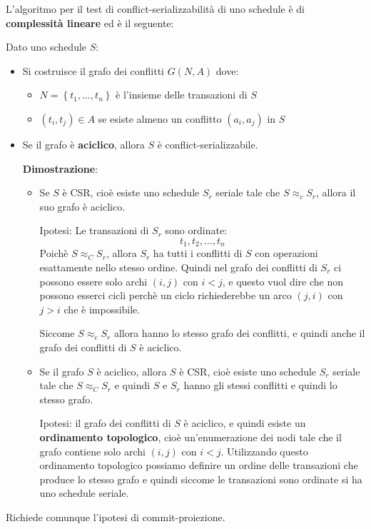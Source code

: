 \documentclass[a4paper]{article}
\begin{document}
\noindent
L'algoritmo per il test di conflict-serializzabilità di uno schedule è di \textbf{
complessità lineare} ed è il seguente:

Dato uno schedule \( S \):
\begin{itemize}
  \item Si costruisce il grafo dei conflitti \( G(N, A) \) dove:
    \begin{itemize}
      \item \( N = \left\{ t_1, \ldots, t_n \right\} \) è l'insieme delle transazioni
        di \( S \) 

      \item \( (t_i, t_j) \in A \) se esiste almeno un conflitto \( (a_i, a_j) \) in 
        \( S \)
    \end{itemize}

  \item Se il grafo è \textbf{aciclico}, allora \( S \) è conflict-serializzabile.

    \vspace{1em}
    \noindent
    \textbf{Dimostrazione}:
    \begin{itemize}
      \item 
        Se \( S \) è CSR, cioè esiste uno schedule \( S_r \) seriale tale che
        \( S \approx_c S_r \), allora il suo grafo è aciclico.

        Ipotesi: Le transazioni di \( S_r \) sono ordinate:
        \[
          t_1, t_2, \ldots, t_n
        \] 
        Poichè \( S \approx_C S_r \), allora \( S_r \) ha tutti i conflitti di \( S \)
        con operazioni esattamente nello stesso ordine. Quindi nel grafo dei conflitti
        di \( S_r \) ci possono essere solo archi \( (i,j) \) con \( i < j \), e questo
        vuol dire che non possono esserci cicli perchè un ciclo richiederebbe un arco 
        \( (j,i) \) con \( j > i \) che è impossibile.

        Siccome \( S \approx_c S_r \) allora hanno lo stesso grafo dei conflitti, e quindi
        anche il grafo dei conflitti di \( S \) è aciclico.

      \item 
        Se il grafo \( S \) è aciclico, allora \( S \) è CSR, cioè esiste uno schedule
        \( S_r \) seriale tale che \( S \approx_C S_r \) e quindi \( S \) e \( S_r \) 
        hanno gli stessi conflitti e quindi lo stesso grafo.

        Ipotesi: il grafo dei conflitti di \( S \) è aciclico, e quindi esiste un
        \textbf{ordinamento topologico}, cioè un'enumerazione dei nodi tale che
        il grafo contiene solo archi \( (i,j) \) con \( i < j \).
        Utilizzando questo ordinamento topologico possiamo definire un ordine
        delle transazioni che produce lo stesso grafo e quindi siccome le transazioni
        sono ordinate si ha uno schedule seriale.
    \end{itemize}
\end{itemize}
Richiede comunque l'ipotesi di commit-proiezione.
\end{document}
